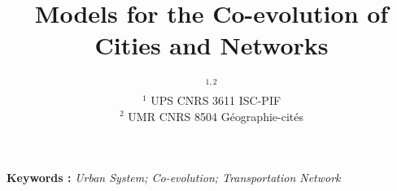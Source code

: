 


\title{Models for the Co-evolution of Cities and Networks}
\author{$^{1,2}$\\
$^1$ UPS CNRS 3611 ISC-PIF\\
$^2$ UMR CNRS 8504 G{\'e}ographie-cit{\'e}s
}
\date{}


\maketitle

\justify


\textbf{Keywords : }\textit{Urban System; Co-evolution; Transportation Network}

\medskip



